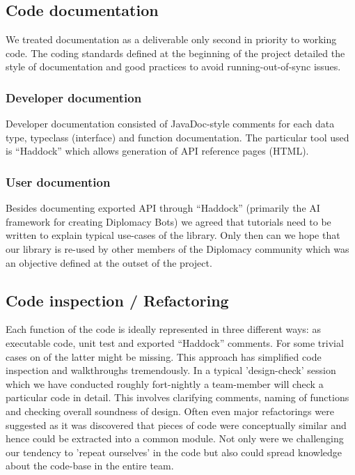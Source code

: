 \documentclass[11pt]{article}
\begin{document}
\subsection{Code documentation}

We treated documentation as a deliverable only second in priority to working
code. The coding standards defined at the beginning of the project detailed 
the style of documentation and good practices to avoid running-out-of-sync
issues.

\subsubsection{Developer documention}

Developer documentation consisted of JavaDoc-style comments for each data type,
typeclass (interface) and function documentation. The particular tool used
is ``Haddock'' which allows generation of API reference pages (HTML).

\subsubsection{User documention}
Besides documenting exported API through ``Haddock'' (primarily the AI framework
for creating Diplomacy Bots) we agreed that tutorials need to be written to 
explain typical use-cases of the library. Only then can we hope that our
library is re-used by other members of the Diplomacy community which was an
objective defined at the outset of the project. 

\subsection{Code inspection / Refactoring}
Each function of the code is ideally represented in three different ways: as 
executable code, unit test and exported ``Haddock'' comments. For some trivial
cases on of the latter might be missing. This approach has simplified code
inspection and walkthroughs tremendously. In a typical 'design-check' session
which we have conducted roughly fort-nightly a team-member will check a 
particular code in detail. This involves clarifying comments, naming of 
functions and checking overall soundness of design. Often even major
refactorings were suggested as it was discovered that pieces of code were
conceptually similar and hence could be extracted into a common module. Not
only were we challenging our tendency to 'repeat ourselves' in the code
but also could spread knowledge about the code-base in the entire team.
\end{document}
